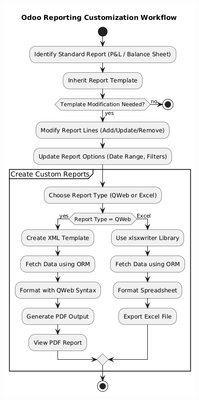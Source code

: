 \documentclass[11pt,a4paper]{article}
\begin{document}
\begin{enumerate}
\begin{minipage}{0.45\textwidth}
\begin{enumerate}
        \end{enumerate}
    \end{minipage}
    \hfill
    \begin{minipage}{0.4\textwidth}
        \centering
        \includegraphics[width=\linewidth]{diagram/reporting_customization_workflow.png}
    \end{minipage}


\end{enumerate}
\end{document}
